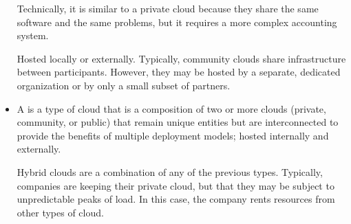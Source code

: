 \begin{itemize}
	Technically, it is similar to a private cloud because they share the same software and the same problems, but it requires a more complex accounting system.
	
	Hosted locally or externally. Typically, community clouds share infrastructure between participants. However, they may be hosted by a separate, dedicated organization or by only a small subset of partners.
	
	
	\item A  is a type of cloud that is a composition of two or more clouds (private, community, or public) that remain unique entities but are interconnected to provide the benefits of multiple deployment models; hosted internally and externally.
	
	Hybrid clouds are a combination of any of the previous types. Typically, companies are keeping their private cloud, but that they may be subject to unpredictable peaks of load. In this case, the company rents resources from other types of cloud.
\end{itemize}